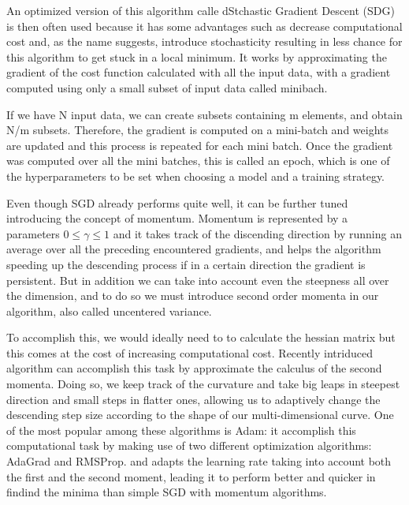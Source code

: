 \documentclass[a4paper,11pt]{article}
\begin{document}
An optimized version of this algorithm calle dStchastic Gradient Descent (SDG) is then often used because it has some advantages such as decrease computational cost and, as the name suggests, introduce stochasticity resulting in less chance for this algorithm to get stuck in a local minimum.
It works by approximating the gradient of the cost function calculated with all the input data, with a gradient computed using only a small subset of input data called minibach.

If we have N input data, we can create subsets containing m elements, and obtain N/m subsets.
Therefore, the gradient is computed on a mini-batch and weights are updated and this process is repeated for each mini batch.
Once the gradient was computed over all the mini batches, this is called an epoch, which is one of the hyperparameters to be set when choosing a model and a training strategy.


Even though SGD already performs quite well, it can be further tuned introducing the concept of momentum.
Momentum is represented by a parameters $0\le \gamma \le 1$ and it takes track of the discending direction by running an average over all the preceding encountered gradients, and helps the algorithm speeding up the descending process if in a certain direction the gradient is persistent.
But in addition we can take into account even the steepness all over the dimension, and to do so we must introduce second order momenta in our algorithm, also called uncentered variance.

To accomplish this, we would ideally need to to calculate the hessian matrix but this comes at the cost of increasing computational cost.
Recently intriduced algorithm can accomplish this task by approximate the calculus of the second momenta.
Doing so, we keep track of the curvature and take big leaps in steepest direction and small steps in flatter ones, allowing us to adaptively change the descending step size according to the shape of our multi-dimensional curve.
One of the most popular among these algorithms is Adam: it accomplish this computational task by making use of two different optimization algorithms: AdaGrad and RMSProp. and adapts the learning rate taking into account both the first and the second moment, leading it to perform better and quicker in findind the minima than simple SGD with momentum algorithms.
\end{document}
